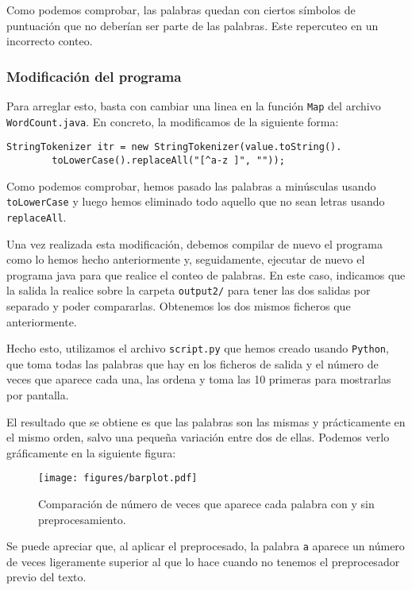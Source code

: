 \documentclass[11pt]{article}
\def\inline{\lstinline[basicstyle=\ttfamily,keywordstyle={}]}
\begin{document}
Como podemos comprobar, las palabras quedan con ciertos símbolos de puntuación que no deberían ser parte de las palabras. Este repercuteo en un incorrecto conteo. 

\subsubsection*{ Modificación del programa }

Para arreglar esto, basta con cambiar una linea en la función \inline{Map} del archivo \inline{WordCount.java}. En concreto, la modificamos de la siguiente forma:

\begin{verbatim}
StringTokenizer itr = new StringTokenizer(value.toString().
        toLowerCase().replaceAll("[^a-z ]", ""));
\end{verbatim}

Como podemos comprobar, hemos pasado las palabras a minúsculas usando \inline{toLowerCase} y luego hemos eliminado todo aquello que no sean letras usando \inline{replaceAll}.

Una vez realizada esta modificación, debemos compilar de nuevo el programa como lo hemos hecho anteriormente y, seguidamente, ejecutar de nuevo el programa java para que realice el conteo de palabras. En este caso, indicamos que la salida la realice sobre la carpeta \inline{output2/} para tener las dos salidas por separado y poder compararlas. Obtenemos los dos mismos ficheros que anteriormente.

Hecho esto, utilizamos el archivo \inline{script.py} que hemos creado usando \inline{Python}, que toma todas las palabras que hay en los ficheros de salida y el número de veces que aparece cada una, las ordena y toma las 10 primeras para mostrarlas por pantalla.

El resultado que se obtiene es que las palabras son las mismas y prácticamente en el mismo orden, salvo una pequeña variación entre dos de ellas. Podemos verlo gráficamente en la siguiente figura:

\begin{figure}[H]
	\centering
	\texttt{[image: figures/barplot.pdf]}
	\caption{Comparación de número de veces que aparece cada palabra con y sin preprocesamiento.}
\end{figure}

Se puede apreciar que, al aplicar el preprocesado, la palabra \inline{a} aparece un número de veces ligeramente superior al que lo hace cuando no tenemos el preprocesador previo del texto.
\end{document}

